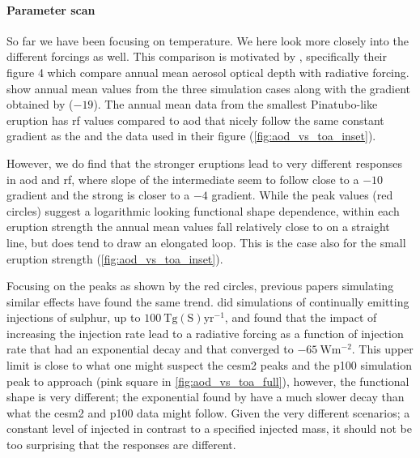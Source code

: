 \documentclass[twocol]{ametsocV5}
\newcommand{\iso}[1][i]{{#1}njected \ce{SO2}}
\begin{document}
\paragraph{Parameter scan}

So far we have been focusing on temperature. We here look more closely into the
different forcings as well. This comparison is motivated by \citet{gregory2016},
specifically their figure 4 which compare annual mean aerosol optical depth with
radiative forcing.  show annual mean values from the three
simulation cases along with the gradient obtained by \citet{gregory2016} (\(-19\)). The
annual mean data from the smallest Pinatubo-like eruption has \acrshort{rf} values
compared to \acrshort{aod} that nicely follow the same constant gradient as the
\citet{gregory2016} and the data used in their figure (\cref{fig:aod_vs_toa_inset}).

However, we do find that the stronger eruptions lead to very different responses in
\acrshort{aod} and \acrshort{rf}, where slope of the intermediate seem to follow close
to a \( -10 \) gradient and the strong is closer to a \( -4 \) gradient. While the peak
values (red circles) suggest a logarithmic looking functional shape dependence, within
each eruption strength the annual mean values fall relatively close to on a straight
line, but does tend to draw an elongated loop. This is the case also for the small
eruption strength (\cref{fig:aod_vs_toa_inset}).

Focusing on the peaks as shown by the red circles, previous papers simulating similar
effects have found the same trend. \citet{niemeier2015} did simulations of continually
emitting injections of sulphur, up to \( \SI{100}{\tera\gram
  \mathrm{(S)}\mathrm{yr}^{-1}} \), and found that the impact of increasing the injection
rate lead to a radiative forcing as a function of injection rate that had an exponential
decay and that converged to \( \SI{-65}{\watt\meter^{-2}} \). This upper limit is close
to what one might suspect the \acrshort{cesm2} peaks and the \acrfull{p100} simulation
peak to approach (pink square in \cref{fig:aod_vs_toa_full}), however, the functional
shape is very different; the exponential found by \citet{niemeier2015} have a much
slower decay than what the \acrshort{cesm2} and \acrshort{p100} data might follow. Given
the very different scenarios; a constant level of \iso{} in contrast to a specified
injected mass, it should not be too surprising that the responses are different.
\end{document}
